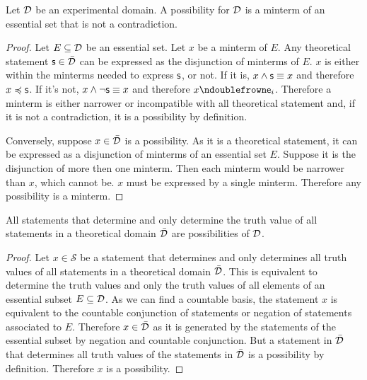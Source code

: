 \documentclass[11pt,letterpaper,fleqn]{memoir} %
\begin{document}
\begin{mathSection}
	
\begin{prop}\label{prop_poss_is_minterm}
	Let $\mathcal{D}$ be an experimental domain. A possibility for $\mathcal{D}$ is a minterm of an essential set that is not a contradiction.
\end{prop}

\begin{proof}
	Let $E \subseteq \mathcal{D}$ be an essential set. Let $x$ be a minterm of $E$. Any theoretical statement $\mathsf{s} \in \bar{\mathcal{D}}$ can be expressed as the disjunction of minterms of $E$. $x$ is either within the minterms needed to express $\mathsf{s}$, or not. If it is, $x \wedge \mathsf{s} \equiv x$ and therefore $x \preccurlyeq \mathsf{s}$. If it's not, $x \wedge \neg \mathsf{s} \equiv x$ and therefore $x \ncomp \obs[e]_i$. Therefore a minterm is either narrower or incompatible with all theoretical statement and, if it is not a contradiction, it is a possibility by definition.
	
	Conversely, suppose $x \in \bar{\mathcal{D}}$ is a possibility. As it is a theoretical statement, it can be expressed as a disjunction of minterms of an essential set $E$. Suppose it is the disjunction of more then one minterm. Then each minterm would be narrower than $x$, which cannot be. $x$ must be expressed by a single minterm. Therefore any possibility is a minterm.
\end{proof}

\begin{prop}
	All statements that determine and only determine the truth value of all statements in a theoretical domain $\bar{\mathcal{D}}$ are possibilities of $\mathcal{D}$.
\end{prop}

\begin{proof}
	Let $x \in \mathcal{S}$ be a statement that determines and only determines all truth values of all statements in a theoretical domain $\bar{\mathcal{D}}$. This is equivalent to determine the truth values and only the truth values of all elements of an essential subset $E \subseteq \mathcal{D}$. As we can find a countable basis, the statement $x$ is equivalent to the countable conjunction of statements or negation of statements associated to $E$. Therefore $x \in \bar{\mathcal{D}}$ as it is generated by the statements of the essential subset by negation and countable conjunction. But a statement in $\bar{\mathcal{D}}$ that determines all truth values of the statements in $\bar{\mathcal{D}}$ is a possibility by definition. Therefore $x$ is a possibility.
\end{proof}
\end{mathSection}
\end{document}

